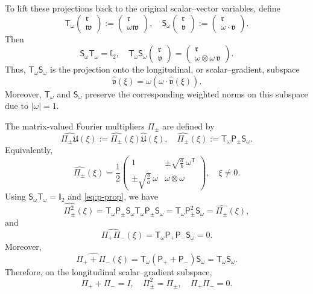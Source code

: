 \documentclass[10pt,reqno]{amsart}
\numberwithin{equation}{section}
\newcommand{\lt}{\left}
\newcommand{\rt}{\right}
\begin{document}
To lift these projections back to the original scalar--vector variables, define
\[
\mathsf T_\omega
\begin{pmatrix}
\mathfrak r\\
\mathfrak w
\end{pmatrix} :=
\begin{pmatrix}
\mathfrak r\\
\omega \mathfrak w
\end{pmatrix},
\quad
\mathsf S_\omega
\begin{pmatrix}
\mathfrak r\\ 
\mathfrak v
\end{pmatrix} := 
\begin{pmatrix}
\mathfrak r\\ 
\omega \cdot \mathfrak v
\end{pmatrix}.
\]
Then 
\[ 
\mathsf S_\omega\mathsf T_\omega=\mathbb I_2, \quad 
\mathsf T_\omega\mathsf S_\omega 
\begin{pmatrix} \mathfrak r \\ 
\mathfrak v 
\end{pmatrix}  
= \begin{pmatrix} 
\mathfrak r \\ 
\omega\otimes\omega\,\mathfrak v 
\end{pmatrix}. 
\] 
Thus, $\mathsf T_\omega\mathsf S_\omega$ is the projection onto the longitudinal, or scalar--gradient, subspace 
\[ 
\widehat{\mathfrak v}(\xi) = \omega\lt(\omega\cdot\widehat{\mathfrak v}(\xi)\rt). 
\]
 Moreover, $\mathsf T_\omega$ and $\mathsf S_\omega$ preserve the corresponding weighted norms on this subspace due to $|\omega|=1$.
 

The matrix-valued Fourier multipliers $\Pi_\pm$ are defined by
\[
\widehat{ \Pi_\pm \mathfrak U }(\xi) := \widehat{\Pi_\pm}(\xi) \widehat{\mathfrak U}(\xi), \quad \widehat{\Pi_\pm}(\xi) := \mathsf T_\omega \mathsf P_\pm \mathsf S_\omega.
\]
Equivalently,
\[
\widehat{\Pi_\pm}(\xi) = \frac{1}{2}
\begin{pmatrix}
1 & \displaystyle \pm \sqrt{\frac{a}{b}} \, \omega^{\mathsf T} \\[2mm]
\displaystyle \pm \sqrt{\frac{b}{a}} \, \omega & \omega \otimes \omega
\end{pmatrix},
\quad \xi\neq0.
\]
Using $\mathsf S_\omega\mathsf T_\omega=\mathbb I_2$ and \eqref{eq:p-prop}, we have 
\[ 
\widehat{\Pi_\pm^2}(\xi) = \mathsf T_\omega\mathsf P_\pm\mathsf S_\omega \mathsf T_\omega\mathsf P_\pm\mathsf S_\omega = \mathsf T_\omega\mathsf P_\pm^2\mathsf S_\omega = \widehat{\Pi_\pm}(\xi), 
\] 
and 
\[ 
\widehat{\Pi_+\Pi_-}(\xi) = \mathsf T_\omega\mathsf P_+\mathsf P_-\mathsf S_\omega =0. 
\] 
Moreover, 
\[ 
\widehat{\Pi_+ + \Pi_-}(\xi) = \mathsf T_\omega(\mathsf P_+ + \mathsf P_-)\mathsf S_\omega = \mathsf T_\omega\mathsf S_\omega. 
\] 
Therefore, on the longitudinal scalar--gradient subspace, 
\[ 
\Pi_+ + \Pi_- = I,\quad \Pi_\pm^2=\Pi_\pm,\quad \Pi_+\Pi_-=0. 
\]
 
\end{document}
